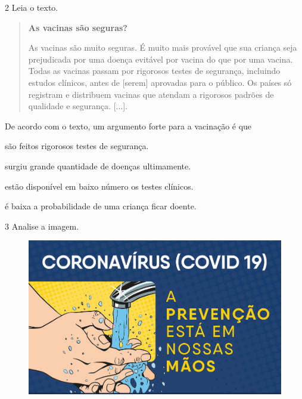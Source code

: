 \num{2} Leia o texto.

\begin{quote}
\textbf{As vacinas são seguras?}

As vacinas são muito seguras. É muito mais provável que sua criança seja
prejudicada por uma doença evitável por vacina do que por uma vacina.
Todas as vacinas passam por rigorosos testes de segurança, incluindo
estudos clínicos, antes de {[}serem{]} aprovadas para o público. Os países só
registram e distribuem vacinas que atendam a rigorosos padrões de
qualidade e segurança.
{[}...{]}.
\end{quote}


\noindent{}De acordo com o texto, um argumento forte para a vacinação é que

\begin{escolha}
\item são feitos rigorosos testes de segurança.

\item surgiu grande quantidade de doenças ultimamente.

\item estão disponível em baixo número os testes clínicos.

\item é baixa a probabilidade de uma criança ficar doente.
\end{escolha}


\num{3} Analise a imagem.

\begin{figure}[htpb!]
\includegraphics[width=\textwidth]{./imgs/img15.png}
\end{figure}


